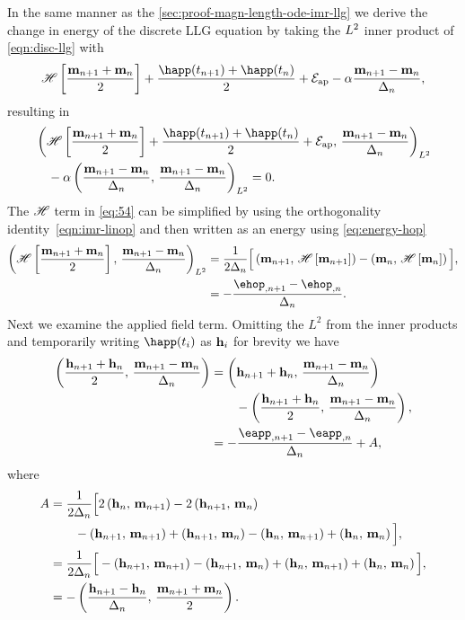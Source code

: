 In the same manner as the \cref{sec:proof-magn-length-ode-imr-llg} we derive the change in energy of the discrete LLG equation by taking the $L^2$ inner product of \cref{eqn:disc-llg} with
\begin{equation}
  \mphop + \frac{\happ(t_{n+1}) + \happ(t_n)}{2} + \happerror - \dampc \mpdmdt,
\end{equation}
resulting in
\begin{equation}
  \begin{aligned}
    &\ltip{\mphop + \frac{\happ(t_{n+1}) + \happ(t_n)}{2} + \happerror}{\mpdmdt} \\
    & \quad - \dampc \ltip{\mpdmdt}{\mpdmdt} = 0.
    \label{eq:54}
  \end{aligned}
\end{equation}
The $\mathscr{H}$ term in \cref{eq:54} can be simplified by using the orthogonality identity~\cref{eqn:imr-linop} and then written as an energy using \cref{eq:energy-hop}
\begin{equation}
  \begin{aligned}
    \ltip{\mphop}{\mpdmdt} 
    &= \frac{1}{2\dtn} \Big[\ip{\mv_{n+1}}{\hop \left[\mv_{n+1} \right]}
    - \ip{\mv_{n}}{ \hop\left[ \mv_{n} \right]} \Big], \\
    &= -\frac{\ehop_{,n+1} - \ehop_{,n}}{\dtn}.
  \end{aligned}
  \label{eq:50}
\end{equation}
Next we examine the applied field term.
Omitting the $L^2$ from the inner products and temporarily writing $\happ(t_i)$ as $\mathbf{h}_i$ for brevity we have
\begin{equation}
  \begin{aligned}
    \ip{\frac{\hv_{n+1} + \hv_n}{2}}{\mpdmdt}
    &= \ip{\hv_{n+1} + \hv_n}{\mpdmdt} \\
    & \qquad - \ip{\frac{\hv_{n+1} + \hv_n}{2}}{\mpdmdt}, \\
    &= -\frac{\eapp_{, n+1} - \eapp_{, n}}{\dtn}  + A,
  \end{aligned}
\end{equation}
where
\begin{equation}
  \begin{aligned}
    A &= \frac{1}{2\Delta_{n}}\Big[ 2\left(\mathbf{h}_n,\, \mathbf{m}_{n+1} \right) - 2\left(\mathbf{h}_{n+1},\, \mathbf{m}_n \right) \\
    & \qquad - \left(\mathbf{h}_{n+1},\, \mathbf{m}_{n+1} \right) +\left(\mathbf{h}_{n+1},\, \mathbf{m}_n \right) 
    - \left(\mathbf{h}_n,\, \mathbf{m}_{n+1} \right) + \left(\mathbf{h}_n,\, \mathbf{m}_n \right) \Big], \\
    &= \frac{1}{2\Delta_{n}}\Big[ - \left(\mathbf{h}_{n+1},\, \mathbf{m}_{n+1} \right) - \left(\mathbf{h}_{n+1},\, \mathbf{m}_n \right) 
    + \left(\mathbf{h}_n,\, \mathbf{m}_{n+1} \right) + \left(\mathbf{h}_n,\, \mathbf{m}_n \right) \Big], \\
    &= - \left( \frac{\mathbf{h}_{n+1} - \mathbf{h}_n}{\Delta_{n}} ,\,  \frac{\mathbf{m}_{n+1} + \mathbf{m}_n}{2}  \right). \\
    \label{eq:52}
  \end{aligned}
\end{equation}
